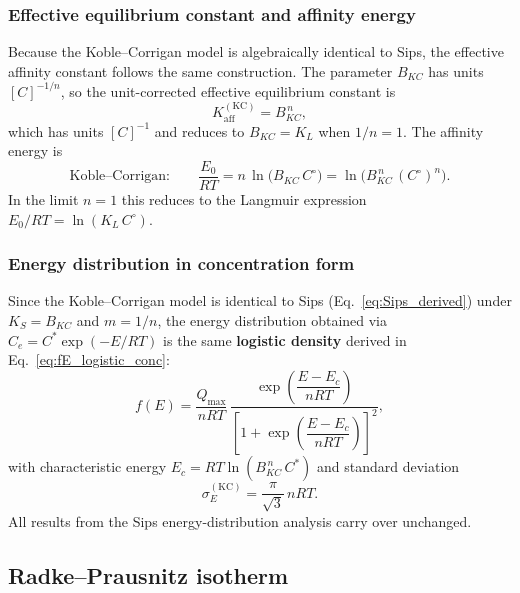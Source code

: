 	\subsubsection{Effective equilibrium constant and affinity energy}

	Because the Koble--Corrigan model is algebraically identical to
	Sips, the effective affinity constant follows the same
	construction.  The parameter $B_{KC}$ has units $[C]^{-1/n}$, so
	the unit-corrected effective equilibrium constant is
	\begin{equation}
		K_{\mathrm{aff}}^{\mathrm{(KC)}} = B_{KC}^{\,n},
	\end{equation}
	which has units $[C]^{-1}$ and reduces to $B_{KC} = K_L$ when
	$1/n = 1$.  The affinity energy is
	\begin{equation}
		\text{Koble--Corrigan:}\qquad
		\frac{E_0}{RT}
		= n\,\ln\!\bigl(B_{KC}\,C^\circ\bigr)
		= \ln\!\bigl(B_{KC}^{\,n}\,(C^\circ)^{n}\bigr).
		\label{eq:E_KC}
	\end{equation}
	In the limit $n = 1$ this reduces to the Langmuir expression
	$E_0 / RT = \ln(K_L\,C^\circ)$.

	\subsubsection{Energy distribution in concentration form}

	Since the Koble--Corrigan model is identical to Sips
	(Eq.~\eqref{eq:Sips_derived}) under $K_S = B_{KC}$ and
	$m = 1/n$, the energy distribution obtained via
	$C_e = C^{\ast}\exp(-E/RT)$ is the same \textbf{logistic density}
	derived in Eq.~\eqref{eq:fE_logistic_conc}:
	\begin{equation}
		f(E)
		= \frac{Q_{\max}}{nRT}\,
		\frac{\exp\!\left(\dfrac{E - E_c}{nRT}\right)}
		{\left[1 + \exp\!\left(\dfrac{E - E_c}{nRT}\right)
		\right]^{2}},
		\label{eq:fE_KC}
	\end{equation}
	with characteristic energy $E_c = RT\ln(B_{KC}^{\,n}\,C^{\ast})$
	and standard deviation
	\begin{equation}
		\sigma_E^{\mathrm{(KC)}}
		= \frac{\pi}{\sqrt{3}}\,nRT.
		\label{eq:sigmaE_KC}
	\end{equation}
	All results from the Sips energy-distribution analysis carry over
	unchanged.

	\subsection{Radke--Prausnitz isotherm}

